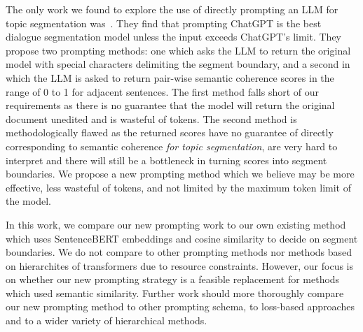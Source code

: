 The only work we found to explore the use of directly prompting an LLM for topic segmentation was~\citep{XingThesis}. They find that prompting ChatGPT is the best dialogue segmentation model unless the input exceeds ChatGPT's limit. They propose two prompting methods: one which asks the LLM to return the original model with special characters delimiting the segment boundary, and a second in which the LLM is asked to return pair-wise semantic coherence scores in the range of 0 to 1 for adjacent sentences. The first method falls short of our requirements as there is no guarantee that the model will return the original document unedited and is wasteful of tokens. The second method is methodologically flawed as the returned scores have no guarantee of directly corresponding to semantic coherence \emph{for topic segmentation}, are very hard to interpret and there will still be a bottleneck in turning scores into segment boundaries. We propose a new prompting method which we believe may be more effective, less wasteful of tokens, and not limited by the maximum token limit of the model.

In this work, we compare our new prompting work to our own existing method which uses SentenceBERT embeddings and cosine similarity to decide on segment boundaries. We do not compare to other prompting methods nor methods based on hierarchites of transformers due to resource constraints. However, our focus is on whether our new prompting strategy is a feasible replacement for methods which used semantic similarity. Further work should more thoroughly compare our new prompting method to other prompting schema, to loss-based approaches and to a wider variety of hierarchical methods.
